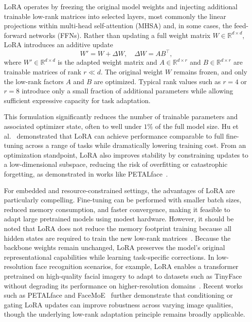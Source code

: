 \documentclass[runningheads,a4paper]{llncs}
\begin{document}
LoRA operates by freezing the original model weights and injecting additional trainable low-rank matrices into selected layers, most commonly the linear projections within multi-head self-attention (MHSA) and, in some cases, the feed-forward networks (FFNs). Rather than updating a full weight matrix $W \in \mathbb{R}^{d \times d}$, LoRA introduces an additive update
\[
W' = W + \Delta W, \quad \Delta W = A B^\top,
\]
where $W' \in \mathbb{R}^{d \times d}$ is the adapted weight matrix and $A \in \mathbb{R}^{d \times r}$ and $B \in \mathbb{R}^{d \times r}$ are trainable matrices of rank $r \ll d$. The original weight $W$ remains frozen, and only the low-rank factors $A$ and $B$ are optimized. Typical rank values such as $r=4$ or $r=8$ introduce only a small fraction of additional parameters while allowing sufficient expressive capacity for task adaptation.

This formulation significantly reduces the number of trainable parameters and associated optimizer state, often to well under $1\%$ of the full model size. Hu et al.~\cite{hu2022lora} demonstrated that LoRA can achieve performance comparable to full fine-tuning across a range of tasks while dramatically lowering training cost. From an optimization standpoint, LoRA also improves stability by constraining updates to a low-dimensional subspace, reducing the risk of overfitting or catastrophic forgetting, as demonstrated in works like PETALface~\cite{narayan2025petalface}.

For embedded and resource-constrained settings, the advantages of LoRA are particularly compelling. Fine-tuning can be performed with smaller batch sizes, reduced memory consumption, and faster convergence, making it feasible to adapt large pretrained models using modest hardware. However, it should be noted that LoRA does not reduce the memory footprint training because all hidden states are required to train the new low-rank matrices~\cite{Wang2025HyCLoRA}. Because the backbone weights remain unchanged, LoRA preserves the model’s original representational capabilities while learning task-specific corrections. In low-resolution face recognition scenarios, for example, LoRA enables a transformer pretrained on high-quality facial imagery to adapt to datasets such as TinyFace without degrading its performance on higher-resolution domains~\cite{narayan2025petalface}. Recent works such as PETALface and FaceMoE~\cite{narayan2025petalface,narayan2024facemoe} further demonstrate that conditioning or gating LoRA updates can improve robustness across varying image qualities, though the underlying low-rank adaptation principle remains broadly applicable.
\end{document}
